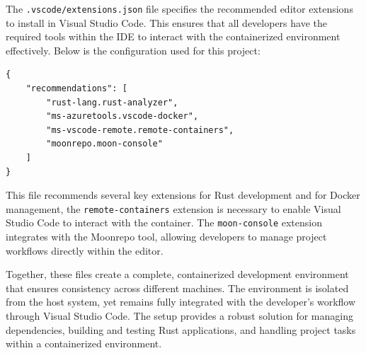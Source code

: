 The \texttt{.vscode/extensions.json} file specifies the recommended editor extensions
to install in Visual Studio Code. This
ensures that all developers have the required tools within the IDE to interact with
the containerized environment effectively. Below is the configuration used for this
project:

\begin{lstlisting}[caption={Recommended VS Code Extensions}]
{
    "recommendations": [
        "rust-lang.rust-analyzer",
        "ms-azuretools.vscode-docker",
        "ms-vscode-remote.remote-containers",
        "moonrepo.moon-console"
    ]
}
\end{lstlisting}

This file recommends several key extensions for Rust development and for Docker
management, the \texttt{remote-containers} extension is necessary
to enable Visual Studio Code to interact
with the container. The \texttt{moon-console} extension integrates with the Moonrepo
tool, allowing developers to manage project workflows directly within the editor.

Together, these files create a complete, containerized development environment that
ensures consistency across different machines. The environment is isolated from the
host system, yet remains fully integrated with the developer's workflow through Visual
Studio Code. The setup provides a robust solution for managing dependencies, building
and testing Rust applications, and handling project tasks within a containerized
environment.
